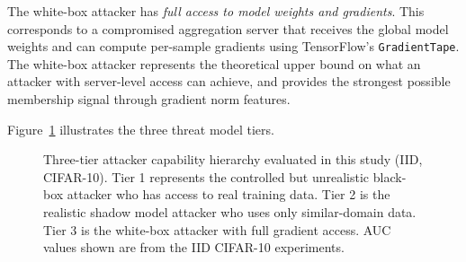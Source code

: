 \documentclass[12pt, a4paper]{report}
\begin{document}
The white-box attacker has \textit{full access to model weights and gradients}.
This corresponds to a compromised aggregation server that receives the global
model weights and can compute per-sample gradients using TensorFlow's
\texttt{GradientTape}. The white-box attacker represents the theoretical upper
bound on what an attacker with server-level access can achieve, and provides the
strongest possible membership signal through gradient norm features.

Figure~\ref{fig:threat_model} illustrates the three threat model tiers.

\begin{figure}[H]
\centering
{}
\caption{Three-tier attacker capability hierarchy evaluated in this study (IID,
CIFAR-10). Tier 1 represents the controlled but unrealistic black-box attacker
who has access to real training data. Tier 2 is the realistic shadow model
attacker who uses only similar-domain data. Tier 3 is the white-box attacker
with full gradient access. AUC values shown are from the IID CIFAR-10 experiments.}
\label{fig:threat_model}
\end{figure}
\end{document}
